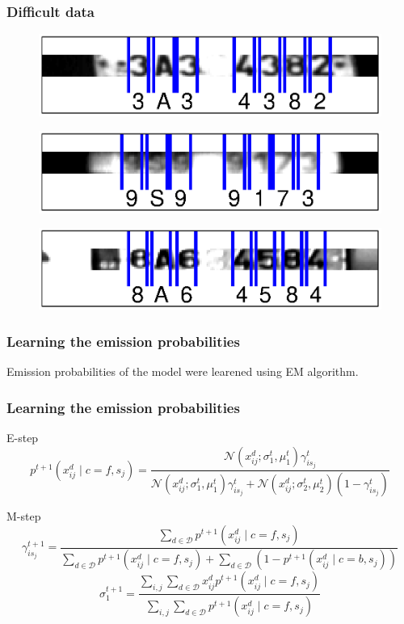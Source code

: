 \documentclass{beamer}
\begin{document}
\begin{frame}
  \frametitle{Difficult data}
\begin{figure}
\includegraphics[width=0.8\linewidth]{pics/bad1.eps}
\end{figure}

\begin{figure}
\includegraphics[width=0.8\linewidth]{pics/bad2.eps}
\end{figure}

\begin{figure}
\includegraphics[width=0.8\linewidth]{pics/bad3.eps}
\end{figure}

\end{frame}


\begin{frame}
  \frametitle{Learning the emission probabilities}
	Emission probabilities of the model were learened using EM algorithm.
  
\end{frame}

\begin{frame}
  \frametitle{Learning the emission probabilities}
\begin{block}{E-step}
	\[
  p^{t+1}(x^d_{ij} \mid c=f, s_j) =
  \frac{\mathcal{N}(x^d_{ij};\sigma_1^t,\mu_1^t)\gamma_{is_j}^t}{\mathcal{N}(x^d_{ij};\sigma_1^t,\mu_1^t)\gamma_{is_j}^t+\mathcal{N}(x^d_{ij};\sigma_2^t,\mu_2^t)(1-\gamma_{is_j}^t)}
\]
	\end{block}

\begin{block}{M-step}
\[
  \gamma_{is_j}^{t+1} = \frac{\sum_{d \in \mathcal{D}} p^{t+1}(x^d_{ij} \mid
    c=f, s_j)}{\sum_{d \in \mathcal{D}} p^{t+1}(x^d_{ij} \mid c=f,
    s_j) + \sum_{d \in \mathcal{D}} (1-p^{t+1}(x^d_{ij} \mid c=b,
    s_j))}
\]
\[
  \sigma_1^{t+1} = \frac{\sum_{i,j} \sum_{d \in \mathcal{D}} x^d_{
      ij} p^{t+1}(x^d_{ij} \mid c=f, s_j)}{\sum_{i,j} \sum_{d \in
      \mathcal{D}} p^{t+1}(x^d_{ij} \mid c=f, s_j)}
\]
\end{block}  
\end{frame}
\end{document}
